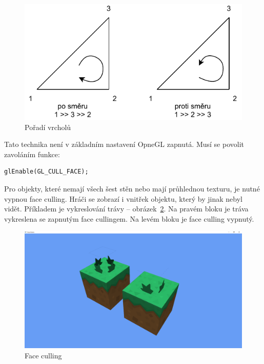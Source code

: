 \documentclass[thesis=M,czech]{FITthesis}[2019/12/23]
\begin{document}
\begin{figure}\centering
	\includegraphics[width=\textwidth]{images/winding_order}
	\caption[Pořadí vrcholů]{Pořadí vrcholů}\label{fig:winding_order}
\end{figure}

Tato technika není v základním nastavení OpneGL zapnutá. Musí se povolit zavoláním funkce:

\begin{verbatim}
glEnable(GL_CULL_FACE);
\end{verbatim}

Pro objekty, které nemají všech šest stěn nebo mají průhlednou texturu, je nutné vypnou face culling. Hráči se zobrazí i vnitřek objektu, který by jinak nebyl vidět. Příkladem je vykreslování trávy -- obrázek~\ref{fig:face_culling}. Na pravém bloku je tráva vykreslena se zapnutým face cullingem. Na levém bloku je face culling vypnutý.

\begin{figure}\centering
	\includegraphics[width=\textwidth]{images/face_culling}
	\caption[Face culling]{Face culling}\label{fig:face_culling}
\end{figure}
\end{document}
